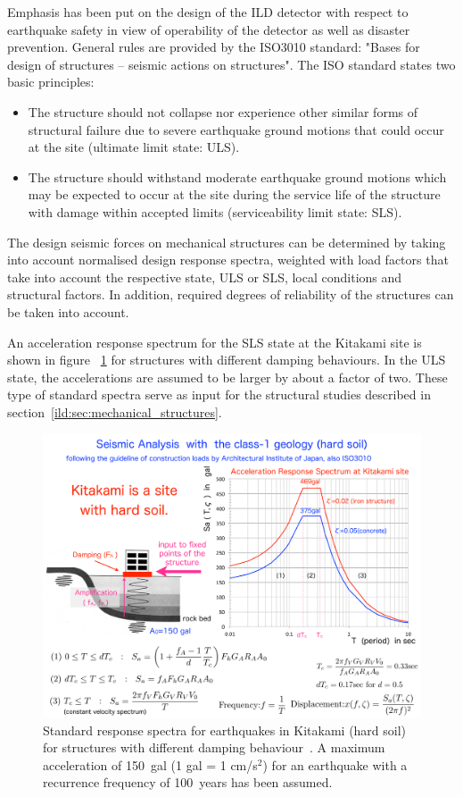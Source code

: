 Emphasis has been put on the design of the ILD detector with respect to earthquake safety in view of operability of the detector as well as disaster prevention. General rules are provided by the ISO3010 standard: "Bases for design of structures -- seismic actions on structures". The ISO standard states two basic principles:
\begin{itemize}
\item The structure should not collapse nor experience other similar forms of structural failure due to severe earthquake ground motions that could occur at the site (ultimate limit state: ULS).
\item The structure should withstand moderate earthquake ground motions which may be expected to occur at the site during the service life of the structure with damage within accepted limits (serviceability limit state: SLS).
\end{itemize}

The design seismic forces on mechanical structures can be determined by taking into account normalised design response spectra, weighted with load factors that take into account the respective state, ULS or SLS, local conditions and structural factors. In addition, required degrees of reliability of the structures can be taken into account.

An acceleration response spectrum for the SLS state at the Kitakami site is shown in figure~ \ref{ild:fig:integration:earthquake_spectra} for structures with different damping behaviours. In the ULS state, the accelerations are assumed to be larger by about a factor of two. These type of standard spectra serve as input for the structural studies described in section~\ref{ild:sec:mechanical_structures}.
\begin{figure}[t!]
\includegraphics[width=0.8\hsize]{Integration/fig/earthquake_spectra.pdf}
\caption{\label{ild:fig:integration:earthquake_spectra}Standard response spectra for earthquakes in Kitakami (hard soil) for structures with different damping behaviour~\cite{ild:bib:earthquake}. A maximum acceleration of 150~gal (1 gal = 1 cm/s$^2$) for an earthquake with a recurrence frequency of 100~years has been assumed.}
\end{figure}

